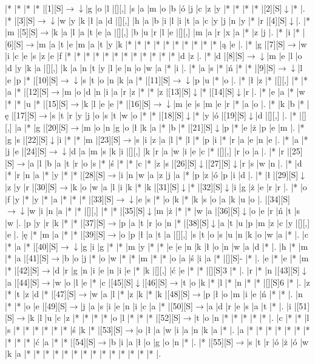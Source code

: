 \documentclass[11pt]{article}
\newcommand\drarr{$\rightarrow \!\!\!\!\! \downarrow$}
\newcommand\rarr{$\rightarrow$}
\newcommand\darr{$\downarrow$}
\begin{document}
\noindent\begin{Puzzle}{24}{29}|*	|*	|*	|*	|[1][S]\drarr	|g	|o	|l	|[][,]{ }	|s	|a	|m	|o	|b	|ó	|j	|c	|z	|y	|*	|*	|*	|*	|[2][S]\darr	|*	|.
|*	|[3][S]\drarr	|w	|y	|k	|ł	|a	|d	|[][,]{ }	|h	|a	|b	|i	|l	|i	|t	|a	|c	|y	|j	|n	|y	|*	|r	|[4][S]\darr	|.
|*	|m	|[5][S]\rarr	|k	|a	|l	|a	|t	|e	|a	|[][,]{ }	|b	|u	|r	|l	|e	|[][,]{ }	|m	|a	|r	|x	|a	|*	|z	|j	|.
|*	|i	|*	|[6][S]\rarr	|m	|a	|t	|e	|m	|a	|t	|y	|k	|*	|*	|*	|*	|*	|*	|*	|*	|*	|*	|ą	|e	|.
|*	|g	|[7][S]\rarr	|w	|i	|c	|e	|s	|z	|e	|f	|*	|*	|*	|*	|*	|*	|*	|*	|*	|*	|*	|*	|d	|z	|.
|*	|d	|[8][S]\drarr	|m	|e	|l	|o	|d	|y	|k	|a	|[][,]{ }	|k	|a	|n	|t	|y	|l	|e	|n	|o	|w	|a	|*	|i	|.
|*	|a	|s	|*	|ń	|*	|*	|[9][S]\drarr	|l	|e	|p	|*	|[10][S]\drarr	|s	|t	|o	|n	|k	|a	|*	|[11][S]\drarr	|p	|u	|*	|o	|.
|*	|ł	|z	|*	|[][,]{ }	|*	|*	|a	|*	|[12][S]\rarr	|m	|o	|d	|n	|i	|a	|r	|z	|*	|*	|z	|[13][S]\darr	|*	|[14][S]\darr	|r	|.
|*	|e	|a	|*	|w	|*	|*	|u	|*	|[15][S]\rarr	|k	|l	|e	|e	|*	|[16][S]\drarr	|m	|e	|s	|m	|e	|r	|*	|a	|o	|.
|*	|k	|b	|*	|ę	|[17][S]\rarr	|s	|t	|r	|y	|j	|o	|s	|t	|w	|o	|*	|*	|[18][S]\darr	|*	|y	|ó	|[19][S]\darr	|d	|[][,]{ }	|.
|*	|[][,]{ }	|a	|*	|g	|[20][S]\rarr	|m	|o	|n	|g	|o	|ł	|k	|a	|*	|b	|*	|[21][S]\darr	|p	|*	|e	|ż	|p	|e	|m	|.
|*	|g	|s	|[22][S]\darr	|i	|*	|*	|m	|[23][S]\rarr	|s	|i	|z	|a	|l	|*	|l	|*	|p	|i	|*	|r	|a	|e	|n	|e	|.
|*	|a	|*	|j	|e	|[24][S]\drarr	|d	|a	|m	|s	|k	|i	|[][,]{ }	|k	|r	|a	|w	|i	|e	|c	|*	|[][,]{ }	|r	|o	|a	|.
|*	|r	|[25][S]\rarr	|a	|l	|b	|a	|t	|r	|o	|s	|*	|ś	|*	|*	|c	|*	|z	|s	|[26][S]\darr	|[27][S]\darr	|r	|s	|w	|n	|.
|*	|d	|*	|r	|n	|a	|*	|y	|*	|*	|[28][S]\rarr	|i	|n	|w	|a	|z	|j	|a	|*	|p	|z	|ó	|p	|i	|d	|.
|*	|ł	|[29][S]\darr	|z	|y	|r	|[30][S]\rarr	|k	|o	|w	|a	|l	|i	|k	|*	|k	|[31][S]\darr	|*	|[32][S]\darr	|i	|g	|ż	|e	|r	|r	|.
|*	|o	|f	|y	|*	|y	|*	|a	|*	|*	|*	|[33][S]\drarr	|e	|s	|*	|o	|k	|*	|k	|s	|o	|a	|k	|u	|o	|.
|[34][S]\drarr	|w	|i	|n	|a	|*	|*	|[][,]{ }	|*	|*	|[35][S]\darr	|m	|ż	|*	|*	|w	|a	|[36][S]\darr	|o	|e	|r	|ń	|t	|s	|w	|.
|p	|y	|r	|k	|*	|*	|[37][S]\rarr	|p	|a	|t	|r	|o	|n	|*	|[38][S]\darr	|a	|t	|u	|p	|m	|z	|c	|y	|[][,]{ }	|e	|.
|ę	|*	|m	|a	|*	|*	|[39][S]\rarr	|o	|p	|ł	|a	|t	|a	|[][,]{ }	|s	|t	|o	|s	|u	|n	|k	|o	|w	|a	|*	|.
|c	|*	|a	|*	|[40][S]\drarr	|g	|i	|g	|*	|*	|m	|y	|*	|*	|e	|e	|n	|k	|ł	|o	|n	|w	|a	|d	|*	|.
|h	|*	|m	|*	|a	|[41][S]\rarr	|b	|o	|j	|*	|o	|w	|*	|*	|m	|*	|*	|o	|a	|ś	|i	|a	|*	|[][S]-	|*	|.
|e	|*	|e	|*	|m	|*	|[42][S]\rarr	|d	|r	|g	|n	|i	|e	|n	|i	|e	|*	|k	|[][,]{ }	|ć	|e	|*	|*	|[][S]3	|*	|.
|r	|*	|n	|[43][S]\darr	|a	|[44][S]\rarr	|w	|o	|l	|e	|*	|c	|[45][S]\darr	|[46][S]\rarr	|t	|o	|k	|*	|l	|*	|n	|*	|*	|[][S]6	|*	|.
|z	|*	|t	|z	|d	|*	|[47][S]\rarr	|w	|a	|l	|*	|z	|k	|*	|k	|[48][S]\rarr	|p	|ł	|o	|m	|i	|e	|ń	|*	|*	|.
|n	|*	|*	|o	|e	|[49][S]\rarr	|j	|a	|s	|i	|e	|n	|i	|c	|a	|*	|[50][S]\rarr	|a	|d	|r	|e	|s	|a	|t	|*	|.
|i	|[51][S]\rarr	|k	|l	|u	|c	|z	|*	|*	|*	|*	|o	|l	|*	|*	|*	|[52][S]\rarr	|t	|o	|n	|*	|*	|*	|*	|*	|.
|c	|*	|*	|l	|s	|*	|*	|*	|*	|*	|*	|ś	|k	|*	|[53][S]\rarr	|o	|ł	|a	|w	|i	|a	|n	|k	|a	|*	|.
|a	|*	|*	|*	|*	|*	|*	|*	|*	|*	|*	|ć	|a	|*	|*	|[54][S]\rarr	|b	|i	|a	|ł	|o	|g	|o	|n	|*	|.
|*	|[55][S]\rarr	|s	|t	|r	|ó	|ż	|ó	|w	|k	|a	|*	|*	|*	|*	|*	|*	|*	|*	|*	|*	|*	|*	|*	|*	|.\end{Puzzle}
\end{document}

